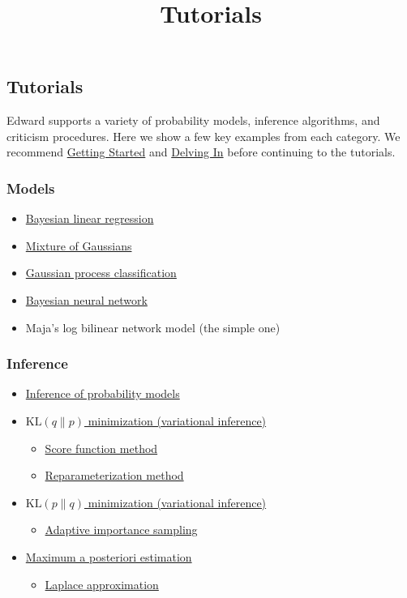 \title{Tutorials}

\subsection{Tutorials}

Edward supports a variety of probability models, inference
algorithms, and criticism procedures. Here we show a few key examples from each
category. We recommend \href{getting-started.html}{Getting Started} and 
\href{delving-in.html}{Delving In} before continuing to the tutorials.

\subsubsection{Models}

\begin{itemize}
\item \href{tut_bayesian_linear_regression.html}{Bayesian linear regression}
\item \href{tut_mixture_gaussian.html}{Mixture of Gaussians}
\item \href{tut_gp_classification.html}{Gaussian process classification}
\item \href{tut_bayesian_nn.html}{Bayesian neural network}
\item Maja's log bilinear network model (the simple one)
\end{itemize}

\subsubsection{Inference}

\begin{itemize}
  \item \href{tut_inference_probability_models.html}{Inference of probability
  models}
  \item \href{tut_KLqp.html}{$\text{KL}(q\|p)$ minimization (variational
  inference)}
  \begin{itemize}
    \item \href{tut_KLqp_score.html}{Score function method}
    \item \href{tut_KLqp_reparam.html}{Reparameterization method}
  \end{itemize}
  \item \href{tut_KLpq.html}{$\text{KL}(p\|q)$ minimization (variational
  inference)}
  \begin{itemize}
    \item \href{tut_KLpq_ais.html}{Adaptive importance sampling}
  \end{itemize}
  \item \href{tut_MAP.html}{Maximum a posteriori estimation}
  \begin{itemize}
    \item \href{tut_MAP_Laplace.html}{Laplace approximation}
  \end{itemize}
\end{itemize}

